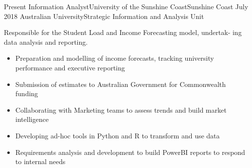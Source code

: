 %
%
%

\begin{experiences}
  \consultantexperience
    {Present}   {Information Analyst}{University of the Sunshine Coast}{Sunshine Coast}
    {July 2018}  {Australian University}{Strategic Information and Analysis Unit}
    {Responsible for the Student Load and Income Forecasting model, undertak- ing data analysis and reporting.
                      \begin{itemize}
		\item Preparation and modelling of income forecasts, tracking university performance and executive reporting
		\item Submission of estimates to Australian Government for Commonwealth funding
		\item Collaborating with Marketing teams to assess trends and build market intelligence 
		\item Developing ad-hoc tools in Python and R to transform and use data
		\item Requirements analysis and development to build PowerBI reports to respond to internal needs
                                                              

\end{itemize}}
\end{experiences}
